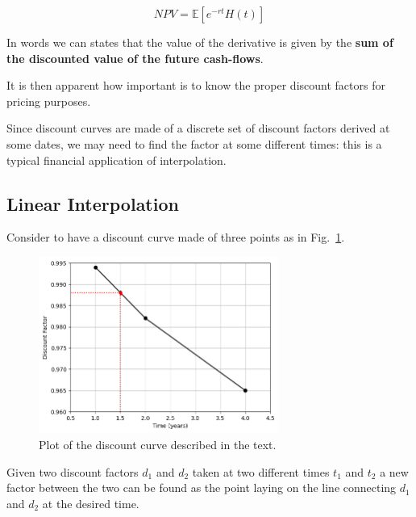 \begin{equation}
NPV = \mathbb{E}[e^{-rt} H(t)]
\end{equation}

In words we can states that the value of the derivative is given by the \textbf{sum of the discounted value of the future cash-flows}.

It is then apparent how important is to know the proper discount factors for pricing purposes.

Since discount curves are made of a discrete set of discount factors derived at some dates, we may need to find the factor at some different times: this is a typical financial application of interpolation.

\subsection{Linear Interpolation}
\label{linear-interpolation}

Consider to have a discount curve made of three points as in Fig.~\ref{fig:samples_for_interpolation}.

\begin{figure}[htbp]
  \centering
  \includegraphics[width=0.7\textwidth]{figures/interp_example1}
  \caption{Plot of the discount curve described in the text.}
  \label{fig:samples_for_interpolation}
\end{figure}

Given two discount factors $d_1$ and $d_2$ taken at two different times $t_1$ and $t_2$ a new factor between the two can be found as the point laying on the line connecting $d_1$ and $d_2$ at the desired time. 

